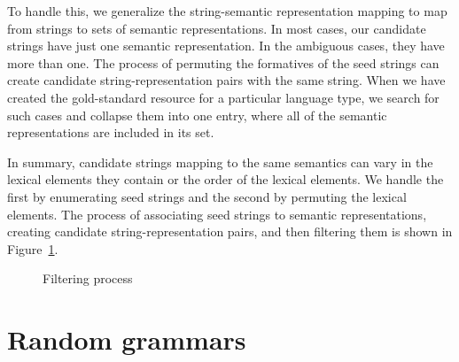 \documentclass[11pt]{article}
\begin{document}

%
To handle this, we generalize the string-semantic representation mapping
to map from strings to sets of semantic representations.  In most cases,
our candidate strings have just one semantic representation.  In the
ambiguous cases, they have more than one.  The process of permuting
the formatives of the seed strings can create candidate string-representation
pairs with the same string.  When we have created the gold-standard resource
for a particular language type, we search for such cases and collapse them
into one entry, where all of the semantic representations are included in
its set.

In summary, candidate strings mapping to the same semantics can vary
in the lexical elements they contain or the order of the lexical
elements.  We handle the first by enumerating seed strings and the
second by permuting the lexical elements.  The process of associating
seed strings to semantic representations, creating candidate
string-representation pairs, and then filtering them is shown in
Figure~\ref{filter_fig}.

\begin{figure}[ht]
\begin{center}
\end{center}
\caption{Filtering process}
\label{filter_fig}
\end{figure}

\section{Random grammars}
\end{document}
